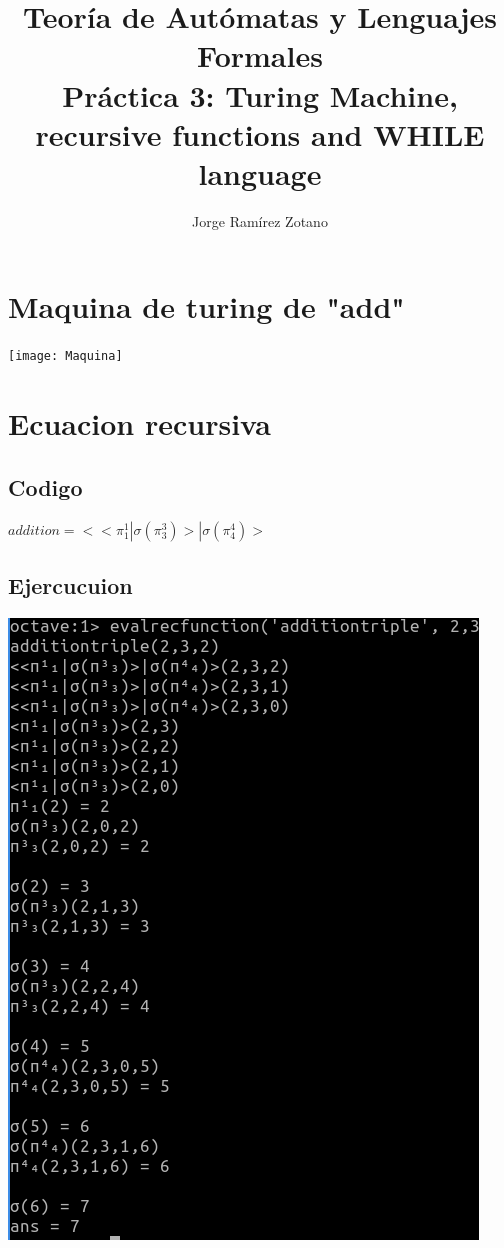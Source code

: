 \documentclass[a4paper]{article}
\title{Teoría de Autómatas y Lenguajes Formales\\[.4\baselineskip]Práctica 3: Turing Machine,
recursive functions and
WHILE language}
\author{Jorge Ramírez Zotano}
\theoremstyle{definition}
\begin{document}
\maketitle
                                                                                                                                
\section{Maquina de turing de "add" }

\texttt{[image: Maquina]} 

\section{Ecuacion recursiva}
\subsection{Codigo}
\begin{center}
$addition = <<\pi^1_1|\sigma(\pi^3_3)>|\sigma(\pi^4_4)> $
\end{center}

\subsection{Ejercucuion}
\includegraphics{Suma}
\end{document}
